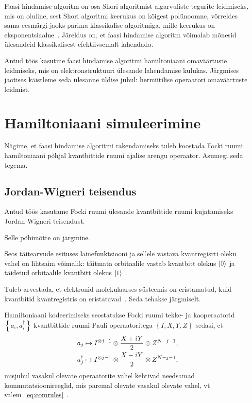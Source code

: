 \documentclass[12pt]{report}
\def\cparen#1{\left\{#1\right\}}
\def\ket#1{\mathinner{|#1\rangle}}
\begin{document}
Faasi hindamise algoritm on osa Shori algoritmist algarvuliste tegurite leidmiseks, mis on oluline, sest Shori algoritmi keerukus on kõigest polünoomne, võrreldes sama eesmärgi jaoks parima klassikalise algoritmiga, mille keerukus on eksponentsiaalne~\cite{cao+etal, kaye+laflamme+mosca}.
Järeldus on, et faasi hindamise algoritm võimalab mõnesid ülesandeid klassikalisest efektiivsemalt lahendada.

Antud töös kasutme faasi hindamise algoritmi hamiltoniaani omaväärtuste leidmiseks, mis on elektronstruktuuri ülesande lahendamise kulukas.
Järgmises jaotises käistleme seda ülesanne üldise juhul: hermiitilise operaatori omaväärtuste leidmist.


\section{Hamiltoniaani simuleerimine}

Nägime, et faasi hindamise algoritmi rakendamiseks tuleb koostada Focki ruumi hamiltoniaani põhjal kvantbittide ruumi ajalise arengu operaator.
Asumegi seda tegema.

\subsection{Jordan-Wigneri teisendus}\label{sec:jw}

Antud töös kasutame Focki ruumi ülesande kvantbittide ruumi kujatamiseks Jordan-Wigneri teisendust.

Selle põhimõtte on järgmine.

Seos täitearvude esituses lainefunktsiooni ja sellele vastava kvantregisrti oleku vahel on lihtsaim võimalik: täitmata orbitaalile vastab kvantbitt olekus \(\ket{0}\) ja täidetud orbitaalile kvantbitt olekus \(\ket{1}\)~\cite{mcardle+etal}.

Tuleb arvestada, et elektronid molekulaarses süsteemis on eristamatud, kuid kvantbitid kvantregistris on eristatavad~\cite{mcardle+etal}.
Seda tehakse järgmiselt.

Hamiltoniaani kodeerimiseks seostatakse Focki ruumi tekke- ja kaoperaatorid \(\cparen{a_i, a_i^\dagger}\) kvantbittide ruumi Pauli operaatoritega \(\cparen{I, X, Y, Z}\) sedasi, et
\begin{align}
    a_j &\mapsto I^{\otimes j-1} \otimes \frac{X+iY}{2} \otimes Z^{N-j-1} \rlap{,} \\
    a_j^\dagger &\mapsto I^{\otimes j-1} \otimes \frac{X-iY}{2} \otimes Z^{N-j-1} \rlap{,}
\end{align}
misjuhul vasakul olevate operaatorite vahel kehtivad needsamad kommutatsioonireeglid, mis paremal olevate vasakul olevate vahel, vt valem~\eqref{eq:comrules}~\cite{mcardle+etal}.
\end{document}
